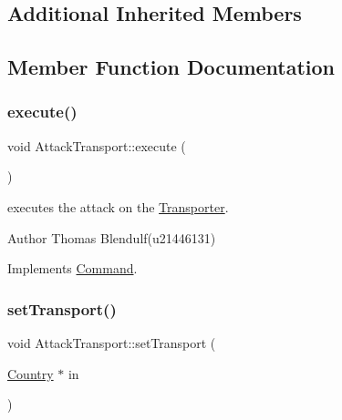 \subsection*{Additional Inherited Members}


\subsection{Member Function Documentation}
\mbox{\label{class_attack_transport_a9fc5c19e5103ecb3e71dbfb21ad1fef9}} 
\subsubsection{\texorpdfstring{execute()}{execute()}}
{\footnotesize\ttfamily void Attack\+Transport\+::execute (\begin{DoxyParamCaption}{ }\end{DoxyParamCaption})\hspace{0.3cm}{\ttfamily [virtual]}}



executes the attack on the \mbox{\hyperlink{class_transporter}{Transporter}}. 

\begin{DoxyAuthor}{Author}
Thomas Blendulf(u21446131) 
\end{DoxyAuthor}


Implements \mbox{\hyperlink{class_command_a6fd7d9bd8df8bfc881e4d6c7cd1878b7}{Command}}.

\mbox{\label{class_attack_transport_ae5170797696e69fa4b9d9c138a77bcd5}} 
\subsubsection{\texorpdfstring{setTransport()}{setTransport()}}
{\footnotesize\ttfamily void Attack\+Transport\+::set\+Transport (\begin{DoxyParamCaption}\item[{\mbox{\hyperlink{class_country}{Country}} $\ast$}]{in }\end{DoxyParamCaption})}



